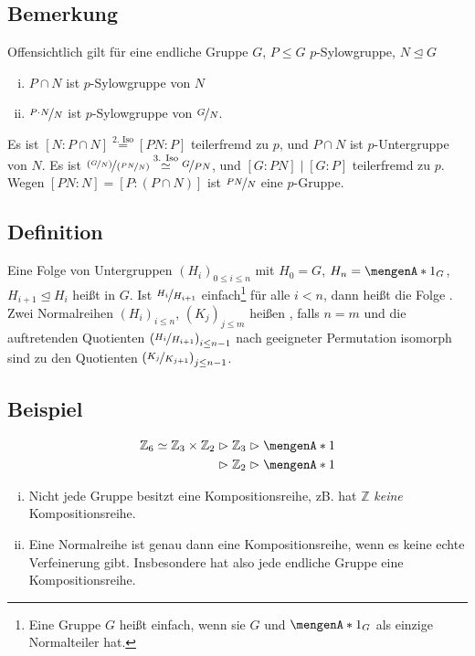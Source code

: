 \subsection[Bemerkung zu $p$-Sylowgruppen in Normalteilern und Faktorgruppen]{Bemerkung} %
\label{sub:110}
Offensichtlich gilt für eine endliche Gruppe $G$, $P \le G$ $p$-Sylowgruppe, $N \unlhd G$
\begin{multicols}{2}
	\begin{enumerate}[(i)]
		\item $P \cap N$ ist $p$-Sylowgruppe von $N$
		\item $\nicefrac{P \cdot N}{N}$ ist $p$-Sylowgruppe von $\nicefrac{G}{N}$.
	\end{enumerate}
\end{multicols}
Es ist $[N : P \cap N] \stackrel{\text{2. Iso}}{=} [PN : P] $ teilerfremd zu $p$, und $P \cap N$ ist $p$-Untergruppe von $N$. Es ist 
$\nicefrac{\enbrace*{\nicefrac{G}{N}}}{\enbrace*{\nicefrac{P N}{N}}} \stackrel{\text{3. Iso}}{\simeq} \nicefrac{G}{PN}$, und $[G : PN] \mid [G :P] $ teilerfremd zu $p$. 
Wegen $[PN : N] = [P : (P \cap N)]  $ ist $\nicefrac{PN}{N}$ eine $p$-Gruppe. \bewende

\subsection[Definition: Normalreihe und Kompositionsreihe]{Definition} %
\label{sub:111}
Eine Folge von Untergruppen $(H_i)_{0 \le i \le n}$ mit $H_0 = G$, $H_n = \set{1_G} $, $H_{i+1} \unlhd H_i$ heißt  in $G$. Ist $\nicefrac{H_i}{H_{i+1}}$
einfach\footnote{ Eine Gruppe $G$ heißt einfach, wenn sie $G$ und $\set{1_G}$ als einzige Normalteiler hat.} für alle $i < n$, 
dann heißt die Folge . Zwei Normalreihen $(H_i)_{i \le n}$, $(K_j)_{j \le m}$ heißen , falls $n=m$
und die auftretenden Quotienten $\enbrace*{\nicefrac{H_i}{H_{i+1}}}_{i \le n-1} $  nach geeigneter Permutation isomorph sind zu den Quotienten 
$\enbrace*{\nicefrac{K_j}{K_{j+1}}}_{j \le n-1} $.

\subsection[Beispiel zu Normalreihen]{Beispiel} %
\label{sub:112}
\begin{align*}
	\mathds{Z}_6 \simeq \mathds{Z}_3 \times \mathds{Z}_2 &\vartriangleright \mathds{Z}_3 \vartriangleright \set{1} \\
	&\vartriangleright \mathds{Z}_2 \vartriangleright \set{1}  
\end{align*}
\begin{enumerate}[(i)]
	\item Nicht jede Gruppe besitzt eine Kompositionsreihe, zB. hat $\mathds{Z}$ \emph{keine} Kompositionsreihe.
	\item Eine Normalreihe ist genau dann eine Kompositionsreihe, wenn es keine echte Verfeinerung gibt. Insbesondere hat also jede endliche Gruppe eine Kompositionsreihe.
\end{enumerate}

